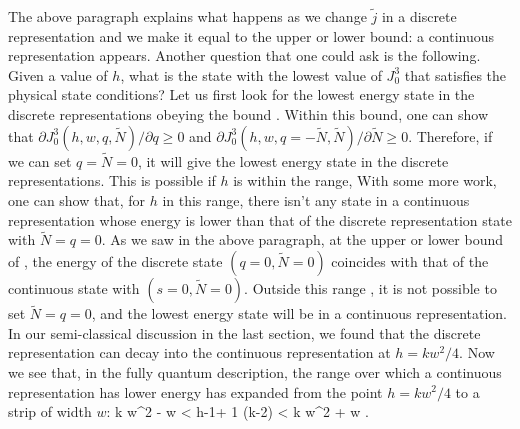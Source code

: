 The above paragraph explains what happens as we change $\tilde{j}$ 
in a discrete representation and we make it equal to the upper or lower 
bound: a continuous representation appears. 
Another question that one could ask is the following. Given a value of $h$, 
what is the state with the lowest value of $J^3_0$ that satisfies the
physical state conditions? 
Let us first look for the lowest energy state in the
discrete representations obeying the bound \rangenew .
Within this bound, one can show that 
$\partial J_0^3(h,w,q,\tilde{N})/\partial q \geq 0$ 
and $\partial J_0^3(h, w, q=-\tilde{N}, \tilde{N})/\partial \tilde{N} \geq 0$.
Therefore, if we can set $q=\tilde{N}=0$,
it will give the lowest energy state in the discrete
representations. This is possible if $h$ is within the range, 
With some more work, one can show that, for $h$ in this 
range, there isn't any state in a continuous representation whose
energy is lower than that of the discrete representation state
with $\tilde{N}=q=0$. As we saw in the above paragraph, at the
upper or lower bound of \rangeh , the energy of the discrete state
$(q=0, \tilde{N}=0)$ coincides with that of the continuous state with 
$(s=0, \tilde{N}=0)$. Outside this range \rangeh , it is not possible
to set $\tilde{N}=q=0$, and the lowest energy state 
will be in a continuous representation. 
In our semi-classical discussion in the last section, 
we found that the discrete representation can decay into
the continuous representation at $h = kw^2/4$. Now we see that, 
in the fully quantum description, the range over which a continuous
representation has lower energy has expanded from 
the point $h=kw^2/4$ to a strip of width $w$:
{ {k } w^2 - {w } < h-1+ {1 (k-2)}
  < {k } w^2 + {w }.  }



 




